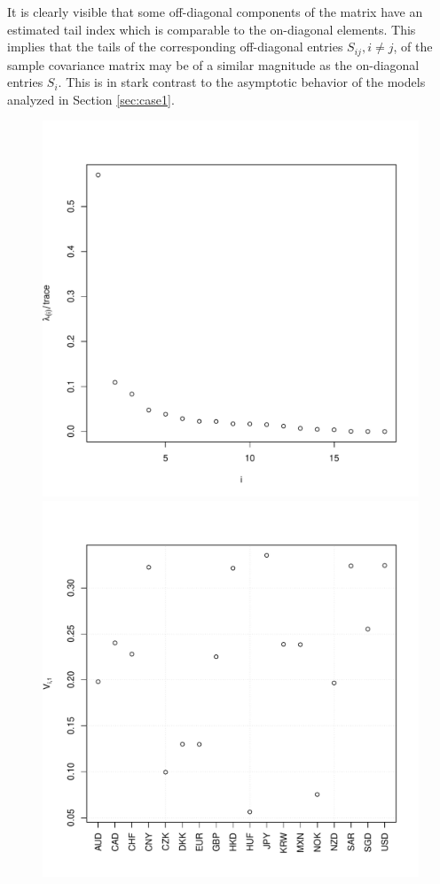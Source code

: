 It is clearly visible that some off-diagonal components of the matrix
have an estimated tail index  which is comparable to the on-diagonal
elements.  This implies that the tails of the corresponding
off-diagonal entries $S_{ij}, i\ne j$, of the sample covariance matrix
may  be of a similar magnitude as the on-diagonal entries $S_i$. This
is in stark contrast to the  asymptotic behavior of the models
analyzed in Section \ref{sec:case1}.

\begin{figure}[ht]
  \begin{minipage}{0.48\linewidth}
    \includegraphics[width=\linewidth]{FX_eigenvalues.pdf}
  \end{minipage}
  \begin{minipage}{0.48\linewidth}
    \includegraphics[width=\linewidth]{FX_eigenvector1.pdf}

\end{minipage}
\end{figure}
